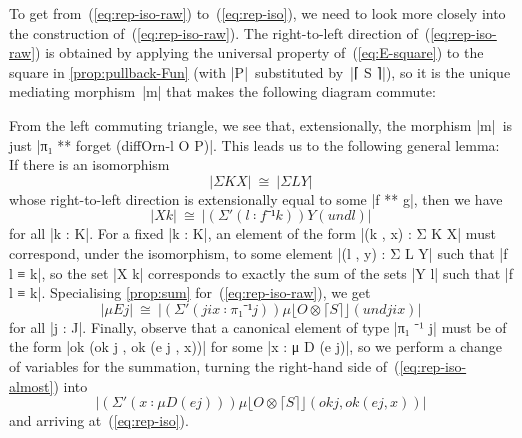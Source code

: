 To get from~(\ref{eq:rep-iso-raw}) to~(\ref{eq:rep-iso}), we need to look more closely into the construction of~(\ref{eq:rep-iso-raw}).
The right-to-left direction of~(\ref{eq:rep-iso-raw}) is obtained by applying the universal property of~(\ref{eq:E-square}) to the square in \autoref{prop:pullback-Fun} (with |P|~substituted by~|⌈ S ⌉|), so it is the unique mediating morphism~|m| that makes the following diagram commute:
\begin{center}
\end{center}
From the left commuting triangle, we see that, extensionally, the morphism |m|~is just |π₁ ** forget (diffOrn-l O P)|.
This leads us to the following general lemma:
If there is an isomorphism
\[ |Σ K X| ~\cong~ |Σ L Y| \]
whose right-to-left direction is extensionally equal to some |f ** g|, then we have
\[ |X k| ~\cong~ |(Σ'(l ∶ f ⁻¹ k)) Y (und l)| \]
for all |k : K|.
For a fixed |k : K|, an element of the form |(k , x) : Σ K X| must correspond, under the isomorphism, to some element |(l , y) : Σ L Y| such that |f l ≡ k|, so the set |X k| corresponds to exactly the sum of the sets |Y l| such that |f l ≡ k|.
\noindent Specialising \autoref{prop:sum} for~(\ref{eq:rep-iso-raw}), we get
\begin{equation}
|μ E j| ~\cong~ |(Σ'(jix ∶ π₁ ⁻¹ j)) μ ⌊ O ⊗ ⌈ S ⌉ ⌋ (und jix)|
\label{eq:rep-iso-almost}
\end{equation}
for all |j : J|.
Finally, observe that a canonical element of type |π₁ ⁻¹ j| must be of the form |ok (ok j , ok (e j , x))| for some |x : μ D (e j)|, so we perform a change of variables for the summation, turning the right-hand side of~(\ref{eq:rep-iso-almost}) into
\[ |(Σ'(x ∶ μ D (e j))) μ ⌊ O ⊗ ⌈ S ⌉ ⌋ (ok j , ok (e j , x))| \]
and arriving at~(\ref{eq:rep-iso}).

